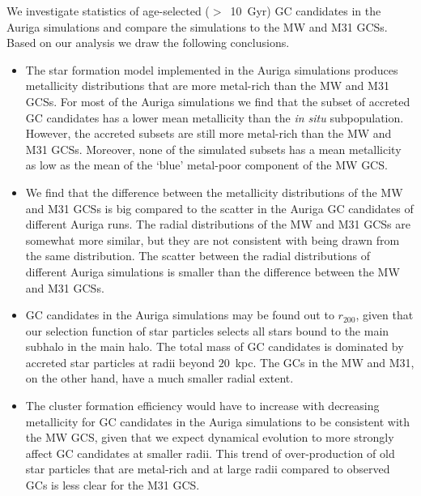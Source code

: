 \documentclass[a4paper,fleqn,usenatbib]{mnras}
\begin{document}
We investigate statistics of age-selected ($>$~10~Gyr) GC candidates in the 
Auriga simulations and compare the simulations to the MW and M31 GCSs. Based on
our analysis we draw the following conclusions.

\begin{itemize}
    \item The star formation model implemented in the Auriga simulations produces
    metallicity distributions that are more metal-rich than the MW and M31
    GCSs. For most of the Auriga simulations we find that the subset of accreted 
    GC candidates has a lower mean metallicity than the {\it in situ} subpopulation.
    However, the accreted subsets are still more metal-rich than the MW and M31 GCSs.
    Moreover, none of the simulated subsets has a mean metallicity as low as the mean
    of the `blue' metal-poor component of the MW GCS.

    \item We find that the difference between the metallicity distributions of 
    the MW and M31 GCSs is big compared to the scatter in the Auriga GC candidates 
    of different Auriga runs. The radial distributions of the MW and M31 GCSs are
    somewhat more similar, but they are not consistent with being drawn from the
    same distribution. The scatter between the radial distributions of different
    Auriga simulations is smaller than the difference between the MW and M31 GCSs.

    \item GC candidates in the Auriga simulations may be found out to $r_{200}$,
    given that our selection function of star particles selects all stars bound
    to the main subhalo in the main halo. The total mass of GC candidates is 
    dominated by accreted star particles at radii beyond $20$~kpc. The GCs in 
    the MW and M31, on the other hand, have a much smaller radial extent.

    \item The cluster formation efficiency would have to increase with decreasing
    metallicity for GC candidates in the Auriga simulations to be consistent
    with the MW GCS, given that we expect dynamical evolution to 
    more strongly affect GC candidates at smaller radii. This trend of over-production
    of old star particles that are metal-rich and at large radii compared to 
    observed GCs is less clear for the M31 GCS.

\end{itemize}
\end{document}
